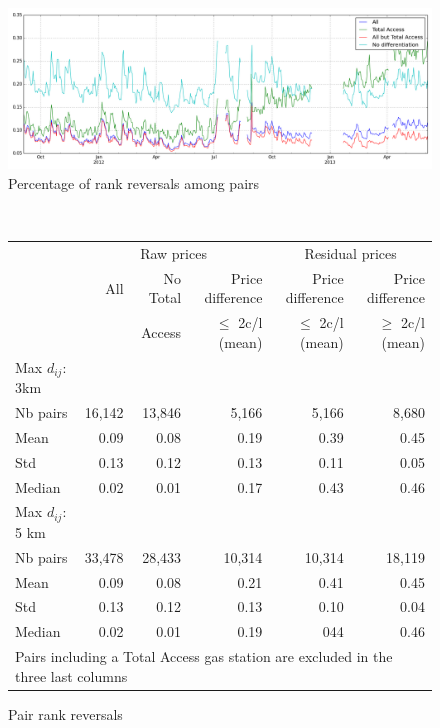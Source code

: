 \documentclass[11pt]{article}
\begin{document}
\begin{figure}[!h]
    \caption{Percentage of rank reversals among pairs}
	\centering
		\includegraphics[width=16cm]{graphs/ecdf_rr_temporal.png}
\end{figure}

\ \\
\begin{figure}
\caption{Pair rank reversals}
\centering
\begin{tabular}{lrrrrr}
\hline
{} & \multicolumn{3}{c}{Raw prices} & \multicolumn{2}{c}{Residual prices}  \\
{} & All & No Total & Price difference & Price difference & Price difference \\
{} & {} & Access & $\le$ 2c/l (mean) & $\le$ 2c/l (mean) & $\ge$ 2c/l (mean)\\
\hline
Max $d_{ij}$: 3km & {} & {} & {} & {} & {} \\
\hline
Nb pairs & 16,142 & 13,846 & 5,166 & 5,166 & 8,680 \\
Mean & 0.09 & 0.08 & 0.19 & 0.39 & 0.45 \\
Std & 0.13 & 0.12 & 0.13 & 0.11 & 0.05 \\
Median & 0.02 & 0.01 & 0.17 & 0.43 & 0.46 \\
\hline
Max $d_{ij}$: 5 km & {} & {} & {} & {} & {} \\
\hline
Nb pairs & 33,478 & 28,433 & 10,314 & 10,314 & 18,119 \\
Mean & 0.09 & 0.08 & 0.21 & 0.41 & 0.45 \\
Std & 0.13 & 0.12 & 0.13 & 0.10 & 0.04 \\
Median & 0.02 & 0.01 & 0.19 & 044 & 0.46 \\
\hline
\multicolumn{6}{l}{\small Pairs including a Total Access gas station are excluded in the three last columns}\\
\end{tabular}
\end{figure}
\end{document}

